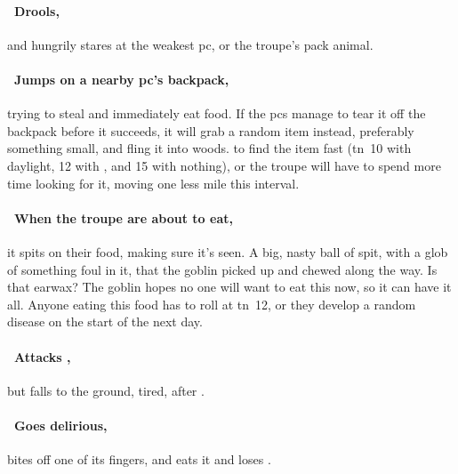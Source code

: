 \documentclass[10pt,twoside]{book}
\begin{document}
\paragraph{\Square~Drools,}
and hungrily stares at the weakest \gls{pc}, or the troupe's pack animal.

\paragraph{\Square~Jumps on a nearby \gls{pc}'s backpack,}
trying to steal and immediately eat food.
If the \glspl{pc} manage to tear it off the backpack before it succeeds, it will grab a random item instead, preferably something small, and fling it into woods.
 to find the item fast (\gls{tn}~10 with daylight, 12 with , and 15 with nothing), or the troupe will have to spend more time looking for it, moving one less mile this \gls{interval}.

\paragraph{\Square~When the troupe are about to eat,}
it spits on their food, making sure it's seen.
A big, nasty ball of spit, with a glob of something foul in it, that the goblin picked up and chewed along the way.
Is that earwax?
The goblin hopes no one will want to eat this now, so it can have it all.
Anyone eating this food has to roll  at \gls{tn}~12, or they develop a random disease%
on the start of the next day.

\paragraph{\Square~Attacks ,}
but falls to the ground, tired, after .

\paragraph{\Square~Goes delirious,}
bites off one of its fingers, and eats it and loses .

\end{document}

